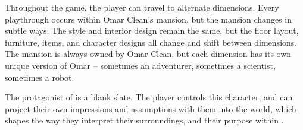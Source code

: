 Throughout the game, the player can travel to alternate dimensions. Every playthrough occurs within Omar Clean's mansion, but the mansion changes in subtle ways. The style and interior design remain the same, but the floor layout, furniture, items, and character designs all change and shift between dimensions. The mansion is always owned by Omar Clean, but each dimension has its own unique version of Omar -- sometimes an adventurer, sometimes a scientist, sometimes a robot. 

The protagonist of \ourgame{} is a blank slate. The player controls this character, and can project their own impressions and assumptions with them into the world, which shapes the way they interpret their surroundings, and their purpose within \ourgame{}.